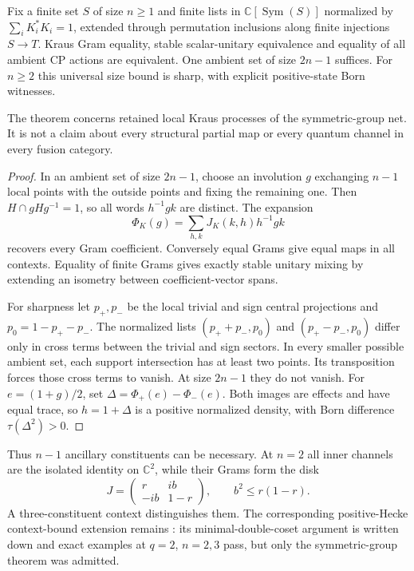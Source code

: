 \begin{theorem}
{\normalfont\statusProved}\quad Fix a finite set $S$ of size $n\geq1$
and finite lists in $\mathbb C[\operatorname{Sym}(S)]$ normalized by
$\sum_iK_i^*K_i=1$, extended through permutation inclusions along finite
injections $S\to T$. Kraus Gram equality, stable scalar-unitary equivalence and equality of
all ambient CP actions are equivalent. One ambient set of size $2n-1$
suffices. For $n\geq2$ this universal size bound is sharp, with explicit
positive-state Born witnesses.
\end{theorem}
\begin{scope}The theorem concerns retained local Kraus processes of
the symmetric-group net. It is not a claim about every structural partial
map or every quantum channel in every fusion category.\end{scope}
\begin{proof}
In an ambient set of size $2n-1$, choose an involution $g$ exchanging
$n-1$ local points with the outside points and fixing the remaining one.
Then $H\cap gHg^{-1}=1$, so all words $h^{-1}gk$ are distinct. The expansion
\[
\Phi_K(g)=\sum_{h,k}J_K(k,h)h^{-1}gk
\]
recovers every Gram coefficient. Conversely equal Grams give equal
maps in all contexts. Equality of finite Grams gives exactly stable
unitary mixing by extending an isometry between coefficient-vector spans.

For sharpness let $p_+,p_-$ be the local trivial and sign central
projections and $p_0=1-p_+-p_-$. The normalized lists
$(p_++p_-,p_0)$ and $(p_+-p_-,p_0)$ differ only in cross terms between
the trivial and sign sectors. In every smaller possible ambient set,
each support intersection has at least two points. Its transposition
forces those cross terms to vanish. At size $2n-1$ they do not vanish.
For $e=(1+g)/2$, set $\Delta=\Phi_+(e)-\Phi_-(e)$.
Both images are effects and have equal trace, so $h=1+\Delta$ is a
positive normalized density, with Born difference $\tau(\Delta^2)>0$.
\end{proof}

Thus $n-1$ ancillary constituents can be necessary. At $n=2$ all inner
channels are the isolated identity on $\mathbb C^2$, while their Grams
form the disk
\[
J=\begin{pmatrix}r&ib\\-ib&1-r\end{pmatrix},\qquad b^2\leq r(1-r).
\]
A three-constituent context distinguishes them. The corresponding
positive-Hecke context-bound extension remains \statusSketch{}: its
minimal-double-coset argument is written down and exact examples at
$q=2$, $n=2,3$ pass, but only the symmetric-group theorem was admitted.

